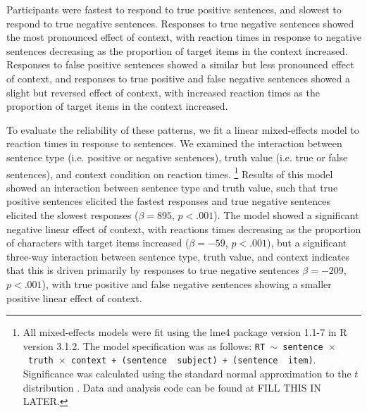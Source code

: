 \documentclass[man]{apa2}
\begin{document}
Participants were fastest to respond to true positive sentences, and slowest to respond to true negative sentences.  Responses to true negative sentences showed the most pronounced effect of context, with reaction times in response to negative sentences decreasing as the proportion of target items in the context increased.  Responses to false positive sentences showed a similar but less pronounced effect of context, and responses to true positive and false negative sentences showed a slight but reversed effect of context, with increased reaction times as the proportion of target items in the context increased.  

To evaluate the reliability of these patterns, we fit a linear mixed-effects model to reaction times in response to sentences.  We examined the interaction between sentence type (i.e. positive or negative sentences), truth value (i.e. true or false sentences), and context condition on reaction times. \footnote{All mixed-effects models were fit using the lme4 package version 1.1-7 in R version 3.1.2.  The model specification was as follows: \texttt{RT $\sim$ sentence~$\times$~truth~$\times$~context + (sentence~\textbar~subject) +  (sentence~\textbar~item)}.  Significance was calculated using the standard normal approximation to the $t$ distribution \cite{barr2013}. Data and analysis code can be found at FILL THIS IN LATER.}  Results of this model showed an interaction between sentence type and truth value, such that true positive sentences elicited the fastest responses and true negative sentences elicited the slowest responses ($\beta= 895$, $p< .001$).  The model showed a significant negative linear effect of context, with reactions times decreasing as the proportion of characters with target items increased ($\beta= -59$, $p< .001$), but a significant three-way interaction between sentence type, truth value, and context indicates that this is driven primarily by responses to true negative sentences $\beta= -209$, $p< .001$), with true positive and false negative sentences showing a smaller positive linear effect of context.  
\end{document}
